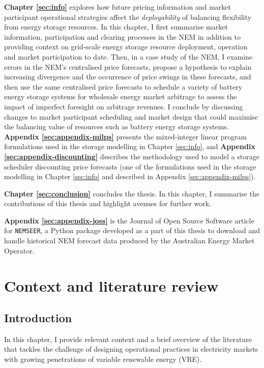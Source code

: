 \documentclass[12pt,a4paper,]{report}
\begin{document}
\textbf{Chapter \ref{sec:info}} explores how future pricing information
and market participant operational strategies affect the
\emph{deployability} of balancing flexibility from energy storage
resources. In this chapter, I first summarise market information,
participation and clearing processes in the NEM in addition to providing
context on grid-scale energy storage resource deployment, operation and
market participation to date. Then, in a case study of the NEM, I
examine errors in the NEM's centralised price forecasts, propose a
hypothesis to explain increasing divergence and the occurrence of price
swings in these forecasts, and then use the same centralised price
forecasts to schedule a variety of battery energy storage systems for
wholesale energy market arbitrage to assess the impact of imperfect
foresight on arbitrage revenues. I conclude by discussing changes to
market participant scheduling and market design that could maximise the
balancing value of resources such as battery energy storage systems.
\textbf{Appendix \ref{sec:appendix-milps}} presents the mixed-integer
linear program formulations used in the storage modelling in Chapter
\ref{sec:info}, and \textbf{Appendix \ref{sec:appendix-discounting}}
describes the methodology used to model a storage scheduler discounting
price forecasts (one of the formulations used in the storage modelling
in Chapter \ref{sec:info} and described in Appendix
\ref{sec:appendix-milps}).

\textbf{Chapter \ref{sec:conclusion}} concludes the thesis. In this
chapter, I summarise the contributions of this thesis and highlight
avenues for further work.

\textbf{Appendix \ref{sec:appendix-joss}} is the Journal of Open Source
Software article for \texttt{NEMSEER}, a Python package developed as a
part of this thesis to download and handle historical NEM forecast data
produced by the Australian Energy Market Operator.

\hypertarget{sec:lit_review}{%
\chapter{Context and literature review}\label{sec:lit_review}}

\hypertarget{introduction}{%
\section{Introduction}\label{introduction}}

In this chapter, I provide relevant context and a brief overview of the
literature that tackles the challenge of designing operational practices
in electricity markets with growing penetrations of variable renewable
energy (VRE).
\end{document}
